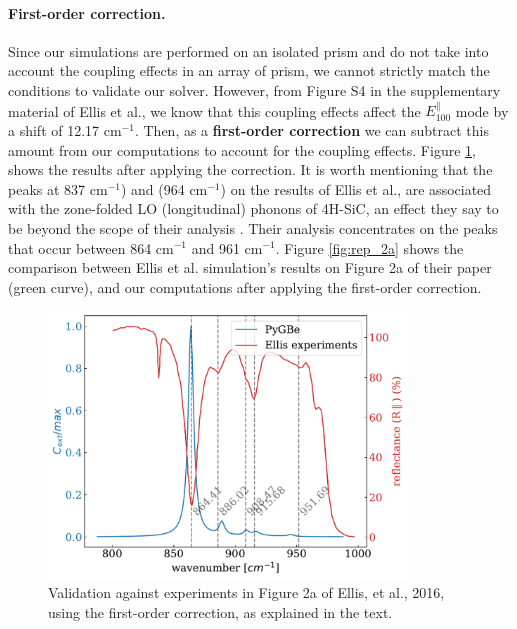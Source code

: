 \paragraph{First-order correction.} Since our simulations are performed on an isolated prism and do not take into account the coupling effects 
in an array of prism, we cannot strictly match the conditions to validate our solver. However, from Figure S4 in the supplementary material of 
Ellis et al., we know that this coupling effects affect the $E^{\parallel}_{100}$ mode by a shift of 12.17 cm$^{-1}$. Then, as a 
\textbf{first-order correction} we can subtract this amount from our computations to account for the coupling effects. Figure \ref{fig:val_2a}, 
shows the results after applying the correction. It is worth mentioning that the peaks at 837 cm$^{-1}$) and (964 cm$^{-1}$) on the results of Ellis et al., 
are associated with the zone-folded LO (longitudinal) phonons of 4H-SiC, an effect they say to be beyond the scope of their analysis \cite{ellis2016}. Their 
analysis concentrates on the peaks that occur between 864 cm$^{-1}$ and 961 cm$^{-1}$. 
Figure \ref{fig:rep_2a} shows the comparison between Ellis et al. simulation's results on Figure 2a of their paper (green curve), and our computations
after applying the first-order correction.

\begin{figure}
    \centering
    \includegraphics[width=0.85\textwidth]{validation_FOA_fig2a_Ellis.pdf} 
    \caption{Validation against experiments in Figure 2a of Ellis, et al., 2016, using the first-order correction, as explained in the text.}
    \label{fig:val_2a}
 \end{figure}


